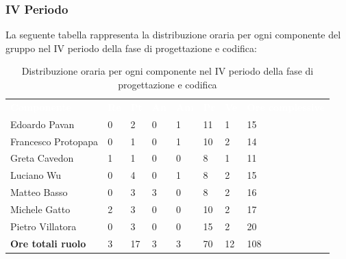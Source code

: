 \subsubsection{IV Periodo}
La seguente tabella rappresenta la distribuzione oraria per ogni componente del gruppo nel IV periodo della fase di progettazione e codifica:
\begin{table}[H]
\begin{center}
\renewcommand{\arraystretch}{1.25}
\begin{tabular}{ m{}<{\centering}  m{}<{\centering} m{}<{\centering} m{}<{\centering}  m{}<{\centering}  m{}<{\centering}  m{}<{\centering}  m{}<{\centering}   }
	\rowcolor{darkblue}
	\textcolor{white}{\textbf{Componente}} &\textcolor{white}{\textbf{Re}}&\textcolor{white}{\textbf{Pt}}&\textcolor{white}{\textbf{An}}&\textcolor{white}{\textbf{Am}}&\textcolor{white}{\textbf{Pr}}&\textcolor{white}{\textbf{Ve}}&\textcolor{white}{\textbf{Ore complessive}}\\ 
	Edoardo Pavan & 0 & 2 & 0 & 1 & 11 & 1 & 15 \\	
	
	Francesco Protopapa & 0 & 1 & 0 & 1 & 10 & 2 & 14 \\

	Greta Cavedon & 1 & 1 & 0 & 0 & 8 & 1 & 11 \\
	
	Luciano Wu & 0 & 4 & 0 & 1 & 8 & 2 & 15 \\
	
	Matteo Basso & 0 & 3 & 3 & 0 & 8 & 2 & 16 \\
	
	Michele Gatto & 2  & 3 & 0 & 0 & 10 & 2 & 17 \\
	
	Pietro Villatora & 0 & 3 & 0 & 0 & 15 & 2 & 20 \\
	
	\textbf{Ore totali ruolo} & 3 & 17 & 3 & 3 & 70 & 12 & 108 \\

\end{tabular}
\caption{Distribuzione oraria per ogni componente nel IV periodo della fase di progettazione e codifica}
\end{center}
\end{table}

